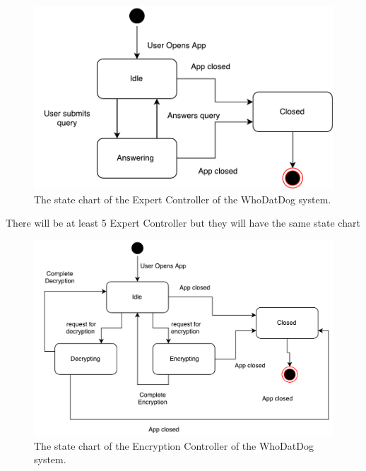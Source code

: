 \documentclass[]{article}
\begin{document}
\begin{figure}[H]
	\centering
	\includegraphics[width=\textwidth]{ExpertController.pdf}
	\caption{\label{fig:analysisclassdiagram}The state chart of the Expert Controller of the WhoDatDog system.}
\end{figure}

There will be at least  5 Expert Controller but they will have the same state chart



\begin{figure}[H]
	\centering
	\includegraphics[width=\textwidth]{EncryptionController.pdf}
	\caption{\label{fig:analysisclassdiagram}The state chart of the Encryption Controller of the WhoDatDog system.}
\end{figure}
\end{document}
